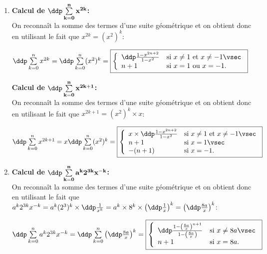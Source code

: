 
\begin{correction}   \;
\begin{enumerate}
\item \textbf{Calcul de $\mathbf{\ddp \sum\limits_{k=0}^{n} x^{2k}}$:}\\
\noindent On reconna\^{i}t la somme des termes d'une suite g\'eom\'etrique et on obtient donc en utilisant le fait que $x^{2k}=(x^2)^k$:\\
\noindent  
\begin{center}
$\ddp \sum\limits_{k=0}^{n} x^{2k}=\ddp \sum\limits_{k=0}^{n} (x^2)^{k}=\fbox{$\left\lbrace \begin{array}{ll}  \ddp\frac{1-x^{2n+2}}{1-x^2} & \hbox{si}\ x\not= 1\ \hbox{et}\ x\not=-1\vsec\\ n+1 & \hbox{si}\ x= 1\ \hbox{ou}\ x=-1.   \end{array}\right.$}$\\
\end{center}

\textbf{Calcul de $\mathbf{\ddp \sum\limits_{k=0}^{n} x^{2k+1}}$:}\\
\noindent On reconna\^{i}t la somme des termes d'une suite g\'eom\'etrique et on obtient donc en utilisant le fait que $x^{2k+1}=(x^2)^k\times x$:\\
\noindent \begin{center}
$\ddp \sum\limits_{k=0}^{n} x^{2k+1}=x\ddp \sum\limits_{k=0}^{n} (x^2)^{k}=\fbox{$\left\lbrace \begin{array}{ll}  x\times \ddp\frac{1-x^{2n+2}}{1-x^2} & \hbox{si}\ x\not= 1\ \hbox{et}\ x\not=-1\vsec\\ n+1 & \hbox{si}\ x= 1\vsec\\ -(n+1)& \hbox{si}\ x=-1.   \end{array}\right.$}$
\end{center}
\item  \textbf{Calcul de $\mathbf{\ddp \sum\limits_{k=0}^{n} a^k 2^{3k} x^{-k}}$:}\\
\noindent On reconna\^{i}t la somme des termes d'une suite g\'eom\'etrique et on obtient donc en utilisant le fait que $a^k 2^{3k} x^{-k}=a^k(2^3)^k\times \ddp\frac{1}{x^k}=a^k\times 8^k\times \left(\ddp\frac{1}{x} \right)^k=\left(\ddp\frac{8a}{x} \right)^k$:\\

\begin{center}
 $\ddp \sum\limits_{k=0}^{n} a^k 2^{3k} x^{-k}=\ddp \sum\limits_{k=0}^{n} \left(\ddp\frac{8a}{x}\right)^k=\fbox{$\left\lbrace \begin{array}{ll}  \ddp\frac{1-\left( \frac{8a}{x}\right)^{n+1}}{1-\left( \frac{8a}{x}\right)} & \hbox{si}\ x\not= 8a \vsec\\ n+1 & \hbox{si}\ x= 8a.   \end{array}\right.$}$ 
\end{center}


\end{enumerate}
\end{correction}

